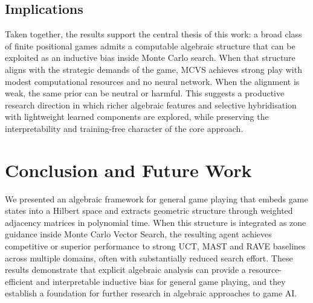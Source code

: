 \documentclass[11pt,a4paper]{article}
\theoremstyle{plain}
\theoremstyle{definition}
\begin{document}
\vspace{0.5em}

\subsection{Implications}

\vspace{0.5em}

Taken together, the results support the central thesis of this work: a broad class of finite positional games admits a computable algebraic structure that can be exploited as an inductive bias inside Monte Carlo search. When that structure aligns with the strategic demands of the game, MCVS achieves strong play with modest computational resources and no neural network. When the alignment is weak, the same prior can be neutral or harmful. This suggests a productive research direction in which richer algebraic features and selective hybridisation with lightweight learned components are explored, while preserving the interpretability and training-free character of the core approach.

\vspace{0.5em}

\section{Conclusion and Future Work}

\vspace{0.5em}

We presented an algebraic framework for general game playing that embeds game states into a Hilbert space and extracts geometric structure through weighted adjacency matrices in polynomial time. When this structure is integrated as zone guidance inside Monte Carlo Vector Search, the resulting agent achieves competitive or superior performance to strong UCT, MAST and RAVE baselines across multiple domains, often with substantially reduced search effort. These results demonstrate that explicit algebraic analysis can provide a resource-efficient and interpretable inductive bias for general game playing, and they establish a foundation for further research in algebraic approaches to game AI.

\vspace{0.5em}
\end{document}
